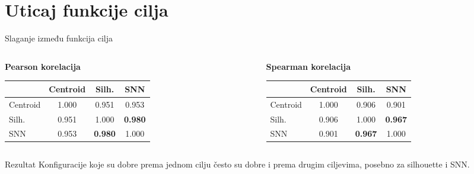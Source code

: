 \documentclass[aspectratio=169,10pt]{beamer}
\begin{document}
\section{Uticaj funkcije cilja}

\begin{frame}{Slaganje između funkcija cilja}
  \begin{columns}[T]
    \begin{column}{0.49\textwidth}
      \textbf{Pearson korelacija}
      \begin{adjustbox}{max width=\textwidth}
      \begin{tabular}{lccc}
        \toprule
        & Centroid & Silh. & SNN \\
        \midrule
        Centroid & 1.000 & 0.951 & 0.953 \\
        Silh. & 0.951 & 1.000 & \textbf{0.980} \\
        SNN & 0.953 & \textbf{0.980} & 1.000 \\
        \bottomrule
      \end{tabular}
      \end{adjustbox}
    \end{column}
    \begin{column}{0.49\textwidth}
      \textbf{Spearman korelacija}
      \begin{adjustbox}{max width=\textwidth}
      \begin{tabular}{lccc}
        \toprule
        & Centroid & Silh. & SNN \\
        \midrule
        Centroid & 1.000 & 0.906 & 0.901 \\
        Silh. & 0.906 & 1.000 & \textbf{0.967} \\
        SNN & 0.901 & \textbf{0.967} & 1.000 \\
        \bottomrule
      \end{tabular}
      \end{adjustbox}
    \end{column}
  \end{columns}

  \vspace{0.8em}
  \begin{block}{Rezultat}
    Konfiguracije koje su dobre prema jednom cilju često su dobre i prema drugim ciljevima, posebno za silhouette i SNN.
  \end{block}
\end{frame}
\end{document}
